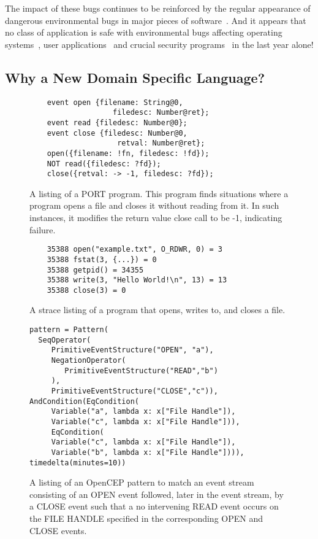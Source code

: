 The impact of these bugs continues to be reinforced by the regular
appearance of dangerous environmental bugs in major pieces of
software~\cite{devzeroroot}.  And it appears that no class of application
is safe with environmental bugs affecting operating
systems~\cite{ubuntuappaport},
user applications~\cite{westerndigitalsymlink} and crucial security
programs~\cite{sudocopy} in the
last year alone!


\subsection{Why a New Domain Specific Language?}
\begin{figure}
  \begin{lstlisting}
    event open {filename: String@0,
                   filedesc: Number@ret};
    event read {filedesc: Number@0};
    event close {filedesc: Number@0,
                    retval: Number@ret};
    open({filename: !fn, filedesc: !fd});
    NOT read({filedesc: ?fd});
    close({retval: -> -1, filedesc: ?fd});
  \end{lstlisting}
  \caption{A listing of a PORT program.  This program finds situations
  where a program opens a file and closes it without reading from it.  In
  such instances, it modifies the return value close call to be -1,
  indicating failure.}
  \label{fig:PORTListing}
\end{figure}

\begin{figure}
  \begin{lstlisting}
    35388 open("example.txt", O_RDWR, 0) = 3
    35388 fstat(3, {...}) = 0
    35388 getpid() = 34355
    35388 write(3, "Hello World!\n", 13) = 13
    35388 close(3) = 0
  \end{lstlisting}
  \caption{A strace listing of a program that opens, writes to, and closes
  a file.}
  \label{fig:StraceListing}
\end{figure}

\begin{figure}
  \begin{lstlisting}
pattern = Pattern(
  SeqOperator(
     PrimitiveEventStructure("OPEN", "a"),
     NegationOperator(
        PrimitiveEventStructure("READ","b")
     ),
     PrimitiveEventStructure("CLOSE","c")),
AndCondition(EqCondition(
     Variable("a", lambda x: x["File Handle"]),
     Variable("c", lambda x: x["File Handle"])),
     EqCondition(
     Variable("c", lambda x: x["File Handle"]),
     Variable("b", lambda x: x["File Handle"]))),
timedelta(minutes=10))
  \end{lstlisting}
  \caption{
    A listing of an OpenCEP pattern to match an event stream consisting of an OPEN event followed, later in the event stream, by a CLOSE event such that a no intervening READ event occurs on the FILE HANDLE specified in the corresponding OPEN and CLOSE events.
}
  \label{fig:OpenCEPListing}
\end{figure}



